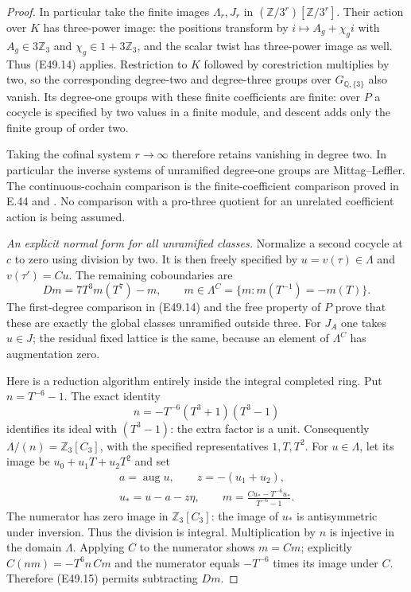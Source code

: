 \begin{proof}
In particular take the finite images
$\Lambda_r,J_r$ in
$(\mathbb Z/3^r)[\mathbb Z/3^r]$.
Their action over $K$ has three-power
image: the positions transform by
$i\mapsto A_g+\chi_gi$ with
$A_g\in3\mathbb Z_3$ and
$\chi_g\in1+3\mathbb Z_3$, and the
scalar twist has three-power image
as well. Thus (E49.14) applies.
Restriction to $K$ followed by
corestriction multiplies by two, so
the corresponding degree-two and
degree-three groups over
$G_{\mathbb Q,\{3\}}$ also vanish.
Its degree-one groups with these
finite coefficients are finite:
over $P$ a cocycle is specified by
two values in a finite module, and
descent adds only the finite group
of order two.

Taking the cofinal system $r\to\infty$
therefore retains vanishing in degree
two. In particular the inverse systems
of unramified degree-one groups are
Mittag--Leffler. The continuous-cochain
comparison is the finite-coefficient
comparison proved in E.44 and
\cite[Proposition 1.6 and Theorem 2.2]{E_JannsenContinuous}.
No comparison with a pro-three quotient
for an unrelated coefficient action
is being assumed.

\emph{An explicit normal form for all unramified classes.}
Normalize a second cocycle at $c$ to
zero using division by two. It is then
freely specified by
$u=v(\tau)\in\Lambda$ and
$v(\tau')=Cu$. The remaining
coboundaries are
\[
     Dm=7T^3m(T^7)-m,\qquad
     m\in\Lambda^C
        =\{m:m(T^{-1})=-m(T)\}.
 \tag{E49.15}
\]
The first-degree comparison in (E49.14)
and the free property of $P$ prove
that these are exactly the global
classes unramified outside three.
For $J_A$ one takes $u\in J$;
the residual fixed lattice is the
same, because an element of
$\Lambda^C$ has augmentation zero.

Here is a reduction algorithm entirely
inside the integral completed ring.
Put $n=T^{-6}-1$. The exact identity
\[
       n=-T^{-6}(T^3+1)(T^3-1)
 \tag{E49.16}
\]
identifies its ideal with $(T^3-1)$:
the extra factor is a unit. Consequently
$\Lambda/(n)=\mathbb Z_3[C_3]$, with
the specified representatives $1,T,T^2$.
For $u\in\Lambda$, let its image be
$u_0+u_1T+u_2T^2$ and set
\[
 \begin{gathered}
       a=\operatorname{aug}u,\qquad z=-(u_1+u_2),\\
       u_* =u-a-z\eta,\qquad
       m=\frac{Cu_*-T^{-6}u_*}{T^{-6}-1}.
 \end{gathered}
 \tag{E49.17}
\]
The numerator has zero image in
$\mathbb Z_3[C_3]$: the image of
$u_*$ is antisymmetric under inversion.
Thus the division is integral.
Multiplication by $n$ is injective
in the domain $\Lambda$.
Applying $C$ to the numerator shows
$m=Cm$; explicitly
$C(nm)=-T^6n\,Cm$ and the numerator
equals $-T^{-6}$ times its image under
$C$. Therefore (E49.15) permits
subtracting $Dm$.


\end{proof}
